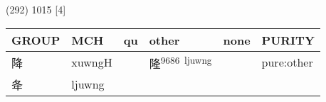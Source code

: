 \documentclass[14pt,a4paper]{scrartcl}
\begin{document}
(292) 1015 {[}4{]}

\begin{longtable}[c]{@{}llllll@{}}
\toprule
\begin{minipage}[b]{0.14\columnwidth}\raggedright\strut
GROUP
\strut\end{minipage} &
\begin{minipage}[b]{0.14\columnwidth}\raggedright\strut
MCH
\strut\end{minipage} &
\begin{minipage}[b]{0.14\columnwidth}\raggedright\strut
qu
\strut\end{minipage} &
\begin{minipage}[b]{0.14\columnwidth}\raggedright\strut
other
\strut\end{minipage} &
\begin{minipage}[b]{0.14\columnwidth}\raggedright\strut
none
\strut\end{minipage} &
\begin{minipage}[b]{0.14\columnwidth}\raggedright\strut
PURITY
\strut\end{minipage}\tabularnewline
\midrule
\endhead
\begin{minipage}[t]{0.14\columnwidth}\raggedright\strut
降
\strut\end{minipage} &
\begin{minipage}[t]{0.14\columnwidth}\raggedright\strut
xuwngH
\strut\end{minipage} &
\begin{minipage}[t]{0.14\columnwidth}\raggedright\strut
\strut\end{minipage} &
\begin{minipage}[t]{0.14\columnwidth}\raggedright\strut
隆\textsuperscript{9686~ljuwng}
\strut\end{minipage} &
\begin{minipage}[t]{0.14\columnwidth}\raggedright\strut
\strut\end{minipage} &
\begin{minipage}[t]{0.14\columnwidth}\raggedright\strut
pure:other
\strut\end{minipage}\tabularnewline
\begin{minipage}[t]{0.14\columnwidth}\raggedright\strut
夅
\strut\end{minipage} &
\begin{minipage}[t]{0.14\columnwidth}\raggedright\strut
ljuwng
\strut\end{minipage} &
\begin{minipage}[t]{0.14\columnwidth}\raggedright\strut

\end{minipage}
\end{longtable}
\end{document}

